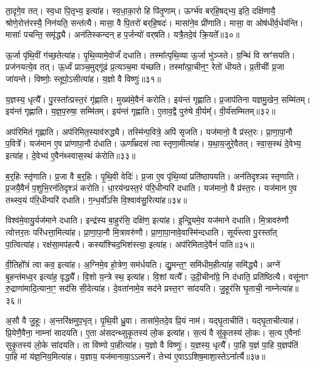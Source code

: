 ता॒दृगे॒व तत्।
स्व॒धा पि॒तृभ्य॒ इत्या॑ह।
स्व॒धा॒का॒रो हि पि॑तृ॒णाम्।
ऊर्ग्भ॑व बर्‌\mbox{}हि॒षद्भ्य॒ इति॒ दक्षि॑णायै॒ श्रोणे॒रोत्त॑रस्यै॒ निन॑यति॒ सन्त॑त्यै।
मासा॒ वै पि॒तरो॑ बर्‌\mbox{}हि॒षदः॑।
मासा॑ने॒व प्री॑णाति।
मासा॒ वा ओष॑धीर्व॒र्धय॑न्ति।
मासाः᳚ पचन्ति॒ समृ॑द्ध्यै।
अन॑तिस्कन्दन् ह प॒र्जन्यो॑ वर्‌\mbox{}षति।
यत्रै॒तदे॒वं क्रि॒यते᳚॥३०॥\ip

ऊ॒र्जा पृ॑थि॒वीं ग॑च्छ॒तेत्या॑ह।
पृ॒थि॒व्यामे॒वोर्जं॑ दधाति।
तस्मा᳚त्\-पृथि॒व्या ऊ॒र्जा भु॑ञ्जते।
ग्र॒न्थिं वि स्रꣳ॑सयति।
प्रज॑नयत्ये॒व तत्।
ऊ॒र्ध्वं प्राञ्च॒मुद्गू॑ढं प्र॒त्यञ्च॒मा य॑च्छति।
तस्मा᳚त्प्रा॒चीन॒ꣳ॒ रेतो॑ धीयते।
प्र॒तीचीः᳚ प्र॒जा जा॑यन्ते।
विष्णोः॒ स्तूपो॒\-ऽसीत्या॑ह।
य॒ज्ञो वै विष्णुः॑॥३१॥\ip

य॒ज्ञस्य॒ धृत्यै᳚।
पु॒रस्ता᳚त्प्रस्त॒रं गृ॑ह्णाति।
मुख्य॑मे॒वैनं॑ करोति।
इय॑न्तं गृह्णाति।
प्र॒जा\-प॑तिना यज्ञमु॒खेन॒ सम्मि॑तम्।
इय॑न्तं गृह्णाति।
य॒ज्ञ॒प॒रुषा॒ सम्मि॑तम्।
इय॑न्तं गृह्णाति।
ए॒ताव॒द्वै पुरु॑षे वी॒र्यम्᳚।
वी॒र्य॑सम्मितम्॥३२॥\ip

अप॑रिमितं गृह्णाति।
अप॑रिमित॒स्या\-व॑\-रुद्ध्यै।
तस्मि॑न्प॒वित्रे॒ अपि॑ \-सृजति।
यज॑मानो॒ वै प्र॑स्त॒रः।
प्रा॒णा॒पा॒नौ प॒वित्रे᳚।
यज॑मान ए॒व प्रा॑णापा॒नौ द॑धाति।
ऊर्णा᳚म्रदसं त्वा स्तृणा॒मीत्या॑ह।
य॒था॒\-य॒जु\-रे॒वै\-तत्।
स्वा॒स॒स्थं दे॒वेभ्य॒ इत्या॑ह।
दे॒वेभ्य॑ ए॒वैन॑थ्स्वास॒स्थं क॑रोति॥३३॥\ip

ब॒र्॒हिः स्तृ॑णाति।
प्र॒जा वै ब॒र्॒हिः।
पृ॒थि॒वी वेदिः॑।
प्र॒जा ए॒व पृ॑थि॒व्यां प्रति॑\-ष्ठापयति।
अन॑तिदृश्ञꣴ स्तृणाति।
प्र॒जयै॒वैनं॑ प॒शुभि॒रन॑तिदृश्ञं करोति।
धा॒रय॑न्प्रस्त॒रं प॑रि॒धीन्परि॑ दधाति।
यज॑मानो॒ वै प्र॑स्त॒रः।
यज॑मान ए॒व तथ्स्व॒यं प॑रि॒धीन्परि॑ दधाति।
ग॒न्ध॒र्वो॑ऽसि वि॒श्वाव॑सु॒रित्या॑ह॥३४॥\ip

विश्व॑मे॒वायु॒र्यज॑माने दधाति।
इन्द्र॑स्य बा॒हुर॑सि॒ दक्षि॑ण॒ इत्या॑ह।
इ॒न्द्रि॒यमे॒व यज॑माने दधाति।
मि॒त्रावरु॑णौ त्वोत्तर॒तः परि॑धत्ता॒मित्या॑ह।
प्रा॒णा॒पा॒नौ मि॒त्रावरु॑णौ।
प्रा॒णा॒पा॒ना\-वे॒वास्मि॑न्द\-धाति।
सूर्य॑स्त्वा पु॒रस्ता᳚त् पा॒त्वित्या॑ह।
रक्ष॑सा॒मप॑हत्यै।
कस्या᳚श्चिद॒भिश॑स्त्या॒ इत्या॑ह।
अप॑रिमितादे॒वैनं॑ पाति॥३५॥\ip

वी॒तिहो᳚त्रं त्वा कव॒ इत्या॑ह।
अ॒ग्निमे॒व हो॒त्रेण॒ सम॑र्धयति।
द्यु॒मन्त॒ꣳ॒ समि॑धीम॒हीत्या॑ह॒ समि॑द्ध्यै।
अग्ने॑ बृ॒हन्त॑मध्व॒र इत्या॑ह॒ वृद्ध्यै᳚।
वि॒शो य॒न्त्रे स्थ॒ इत्या॑ह।
वि॒शां यत्यै᳚।
उ॒दी॒चीना᳚ग्रे॒ नि द॑धाति॒ प्रति॑\-ष्ठित्यै।
वसू॑नाꣳ रु॒द्राणा॑मादि॒त्याना॒ꣳ॒ सद॑सि सी॒देत्या॑ह।
दे॒वता॑नामे॒व सद॑ने प्रस्त॒रꣳ सा॑दयति।
जु॒हूर॑सि घृ॒ताची॒ नाम्नेत्या॑ह॥३६॥\ip

अ॒सौ वै जु॒हूः।
अ॒न्तरि॑क्षमुप॒भृत्।
पृ॒थि॒वी ध्रु॒वा।
तासा॑मे॒तदे॒व प्रि॒यं नाम॑।
यद्\mbox{}घृ॒ताचीति॑।
यद्\mbox{}घृ॒ताचीत्याह॑।
प्रि॒येणै॒वैना॒ नाम्ना॑ सादयति।
ए॒ता अ॑सदन्थ्सुकृ॒तस्य॑ लो॒क इत्या॑ह।
स॒त्यं वै सु॑कृ॒तस्य॑ लो॒कः।
स॒त्य ए॒वैनाः᳚ सुकृ॒तस्य॑ लो॒के सा॑दयति।
ता वि॑ष्णो पा॒हीत्या॑ह।
य॒ज्ञो वै विष्णुः॑।
य॒ज्ञस्य॒ धृत्यै᳚।
पा॒हि य॒ज्ञं पा॒हि य॒ज्ञप॑तिं पा॒हि मां य॑ज्ञ॒निय॒मित्या॑ह।
य॒ज्ञाय॒ यज॑मानाया॒ऽऽत्मने᳚।
तेभ्य॑ ए॒वाऽऽशिष॒माशा॒स्ते\-ऽना᳚र्त्यै॥३७॥\ip\anuvakamend[स्थेत्या॑ह पृथि॒वी वेदि॒र्यन्ति॑ क्रि॒यते॒ वीणु॑र्वी॒र्य॑सम्मितं करोत्याह पाति॒ नाम्नेत्या॑ह लो॒के सा॑दयति॒ षट् च॑]

